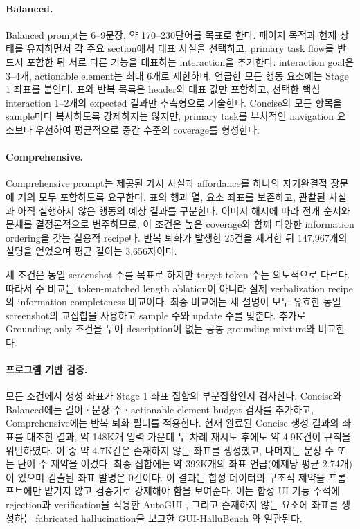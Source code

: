 \paragraph{Balanced.}
Balanced prompt는 6--9문장, 약 170--230단어를 목표로 한다.
페이지 목적과 현재 상태를 유지하면서 각 주요 section에서 대표
사실을 선택하고, primary task flow를 반드시 포함한 뒤 서로 다른
기능을 대표하는 interaction을 추가한다. interaction goal은
3--4개, actionable element는 최대 6개로 제한하며, 언급한 모든
행동 요소에는 Stage 1 좌표를 붙인다. 표와 반복 목록은 header와
대표 값만 포함하고, 선택한 핵심 interaction 1--2개의 expected
결과만 추측형으로 기술한다. Concise의 모든 항목을 sample마다
복사하도록 강제하지는 않지만, primary task를 부차적인 navigation
요소보다 우선하여 평균적으로 중간 수준의 coverage를 형성한다.

\paragraph{Comprehensive.}
Comprehensive prompt는 제공된 가시 사실과 affordance를 하나의
자기완결적 장문에 거의 모두 포함하도록 요구한다. 표의 행과 열,
요소 좌표를 보존하고, 관찰된 사실과 아직 실행하지 않은 행동의
예상 결과를 구분한다. 이미지 해시에 따라 전개 순서와 문체를
결정론적으로 변주하므로, 이 조건은 높은 coverage와 함께 다양한
information ordering을 갖는 실용적 recipe다. 반복 퇴화가 발생한
25건을 제거한 뒤 147,967개의 설명을 얻었으며 평균 길이는
3,656자이다.

세 조건은 동일 screenshot 수를 목표로 하지만 target-token 수는
의도적으로 다르다. 따라서 주 비교는 token-matched length
ablation이 아니라 실제 verbalization recipe의 information
completeness 비교이다. 최종 비교에는 세 설명이 모두 유효한 동일
screenshot의 교집합을 사용하고 sample 수와 update 수를 맞춘다.
추가로 Grounding-only 조건을 두어 description이 없는 공통
grounding mixture와 비교한다.



\paragraph{프로그램 기반 검증.}
모든 조건에서 생성 좌표가 Stage 1 좌표 집합의 부분집합인지
검사한다. Concise와 Balanced에는 길이ㆍ문장 수ㆍactionable-element
budget 검사를 추가하고, Comprehensive에는 반복 퇴화 필터를
적용한다. 현재 완료된 Concise 생성 결과의 좌표를 대조한 결과,
약 148K개 입력 가운데 두 차례 재시도 후에도 약 4.9K건이 규칙을
위반하였다. 이 중 약 4.7K건은 존재하지 않는 좌표를 생성했고,
나머지는 문장 수 또는 단어 수 제약을 어겼다. 최종 집합에는 약
392K개의 좌표 언급(예제당 평균 2.74개)이 있으며 검출된 좌표
발명은 0건이다. 이 결과는 합성 데이터의 구조적 제약을 프롬프트에만
맡기지 않고 검증기로 강제해야 함을 보여준다.
이는 합성 UI 기능 주석에 rejection과 verification을 적용한
AutoGUI \citep{li2025autogui}, 그리고 존재하지 않는 요소에 좌표를
생성하는 fabricated hallucination을 보고한 GUI-HalluBench
\citep{zhang2026guihallu}와 일관된다.


